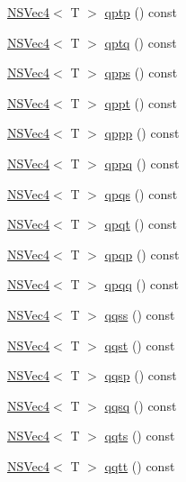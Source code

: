 \begin{DoxyCompactItemize}
\item 
\hyperlink{structNSVec4}{N\-S\-Vec4}$<$ T $>$ \hyperlink{structNSVec4_a866ce4557d6da3383786fe8a6f44f26a}{qptp} () const 
\item 
\hyperlink{structNSVec4}{N\-S\-Vec4}$<$ T $>$ \hyperlink{structNSVec4_a803706fe9fb66e554862ce97b4df8342}{qptq} () const 
\item 
\hyperlink{structNSVec4}{N\-S\-Vec4}$<$ T $>$ \hyperlink{structNSVec4_ae58611372572f6296e55cb1bf2abf9a5}{qpps} () const 
\item 
\hyperlink{structNSVec4}{N\-S\-Vec4}$<$ T $>$ \hyperlink{structNSVec4_a22f3a2151966b1ffe6d7e0dce6d5a047}{qppt} () const 
\item 
\hyperlink{structNSVec4}{N\-S\-Vec4}$<$ T $>$ \hyperlink{structNSVec4_a2dda43ad77f94fcdd63db591bc267853}{qppp} () const 
\item 
\hyperlink{structNSVec4}{N\-S\-Vec4}$<$ T $>$ \hyperlink{structNSVec4_af210652b7624c7a46f724f7f58cf9f60}{qppq} () const 
\item 
\hyperlink{structNSVec4}{N\-S\-Vec4}$<$ T $>$ \hyperlink{structNSVec4_a6894346caa62a25a251c4aeca7bab569}{qpqs} () const 
\item 
\hyperlink{structNSVec4}{N\-S\-Vec4}$<$ T $>$ \hyperlink{structNSVec4_a532fb65a797f26b6c42a78f79c247f4e}{qpqt} () const 
\item 
\hyperlink{structNSVec4}{N\-S\-Vec4}$<$ T $>$ \hyperlink{structNSVec4_a57b48ece6956337e028444720cdd1bf2}{qpqp} () const 
\item 
\hyperlink{structNSVec4}{N\-S\-Vec4}$<$ T $>$ \hyperlink{structNSVec4_a256d3c8e88f01cb6f008a8ea2fe5974d}{qpqq} () const 
\item 
\hyperlink{structNSVec4}{N\-S\-Vec4}$<$ T $>$ \hyperlink{structNSVec4_ad3d95e907d1fc490e4747715ff9affc3}{qqss} () const 
\item 
\hyperlink{structNSVec4}{N\-S\-Vec4}$<$ T $>$ \hyperlink{structNSVec4_ae9b401376bcaa6ca38ce3e94745d2528}{qqst} () const 
\item 
\hyperlink{structNSVec4}{N\-S\-Vec4}$<$ T $>$ \hyperlink{structNSVec4_a61eff3bb8834928e3884dbdd36df215f}{qqsp} () const 
\item 
\hyperlink{structNSVec4}{N\-S\-Vec4}$<$ T $>$ \hyperlink{structNSVec4_a03cc56573374adf9dafdcc1a6f9f3a83}{qqsq} () const 
\item 
\hyperlink{structNSVec4}{N\-S\-Vec4}$<$ T $>$ \hyperlink{structNSVec4_af717dabf2a51687421d415c93ceffcc5}{qqts} () const 
\item 
\hyperlink{structNSVec4}{N\-S\-Vec4}$<$ T $>$ \hyperlink{structNSVec4_a998257122e1abd364cfeabcbad5ecebc}{qqtt} () const 

\end{DoxyCompactItemize}
